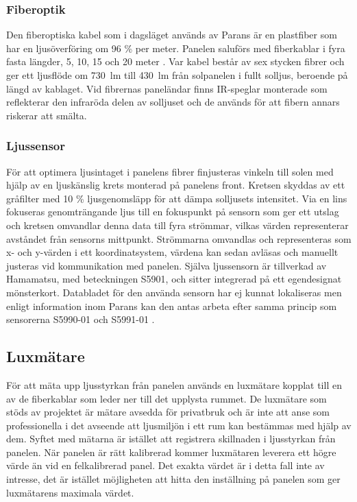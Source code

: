         \subsubsection{Fiberoptik} %
        \label{ssub:fiberoptik}
            Den fiberoptiska kabel som i dagsläget används av Parans är en plastfiber som har en ljusöverföring om 96 \% per meter. Panelen saluförs med fiberkablar i fyra fasta längder, 5, 10, 15 och 20 meter \cite{parans_spec}. Var kabel består av sex stycken fibrer och ger ett ljusflöde om 730~lm till 430~lm från solpanelen i fullt solljus, beroende på längd av kablaget. Vid fibrernas paneländar finns IR-speglar monterade som reflekterar den infraröda delen av solljuset och de används för att fibern annars riskerar att smälta.

        \newpage
        \subsubsection{Ljussensor} %
        \label{ssub:ljussensor}
            För att optimera ljusintaget i panelens fibrer finjusteras vinkeln till solen med hjälp av en ljuskänslig krets monterad på panelens front. Kretsen skyddas av ett gråfilter med 10 \% ljusgenomsläpp för att dämpa solljusets intensitet. Via en lins fokuseras genomträngande ljus till en fokuspunkt på sensorn som ger ett utslag och kretsen omvandlar denna data till fyra strömmar, vilkas värden representerar avståndet från sensorns mittpunkt. Strömmarna omvandlas och representeras som x- och y-värden i ett koordinatsystem, värdena kan sedan avläsas och manuellt justeras vid kommunikation med panelen. Själva ljussensorn är tillverkad av Hamamatsu, med beteckningen S5901, och sitter integrerad på ett egendesignat mönsterkort. Databladet för den använda sensorn har ej kunnat lokaliseras men enligt information inom Parans kan den antas arbeta efter samma princip som sensorerna S5990-01 och S5991-01 \cite{hama}.

    \subsection{Luxmätare} %
    \label{sub:luxm_tare}
    För att mäta upp ljusstyrkan från panelen används en luxmätare kopplat till en av de fiberkablar som leder ner till det upplysta rummet. De luxmätare som stöds av projektet är mätare avsedda för privatbruk och är inte att anse som professionella i det avseende att ljusmiljön i ett rum kan bestämmas med hjälp av dem. Syftet med mätarna är istället att registrera skillnaden i ljusstyrkan från panelen. När panelen är rätt kalibrerad kommer luxmätaren leverera ett högre värde än vid en felkalibrerad panel. Det exakta värdet är i detta fall inte av intresse, det är istället möjligheten att hitta den inställning på panelen som ger luxmätarens maximala värdet.


